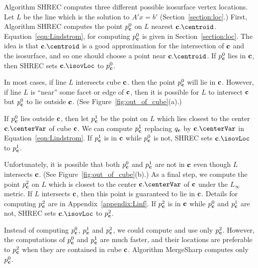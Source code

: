 Algorithm SHREC computes three different possible isosurface vertex locations.
Let $L$ be the line which is the solution to $A' x = b'$
(Section~\ref{section:loc}.)
First, Algorithm SHREC computes the point $p^0_{\mathbf{c}}$ 
on $L$ nearest $\cb.\centroid$.
Equation~\ref{eqn:Lindstrom}, for computing $p^0_{\mathbf{c}}$ is given
in Section~\ref{section:loc}.
The idea is that $\cb.\centroid$ is a good approximation
for the intersection of $\mathbf{c}$ and the isosurface,
and so one should choose a point near $\cb.\centroid$.
If $p^0_{\mathbf{c}}$ lies in $\mathbf{c}$, then SHREC sets $\cb.\isovLoc$ to $p^0_{\mathbf{c}}$.

In most cases, if line $L$ intersects cube $\mathbf{c}$.
then the point $p^0_{\mathbf{c}}$ will lie in $\mathbf{c}$.
However, if line $L$ is ``near'' some facet or edge of $\mathbf{c}$,
then it is possible for $L$ to intersect $\mathbf{c}$ but $p^0_{\mathbf{c}}$ to lie
outside $\mathbf{c}$.
(See Figure~\ref{fig:out_of_cube}(a).)

If $p^0_{\mathbf{c}}$ lies outside $\mathbf{c}$,
then let $p^1_{\mathbf{c}}$ be the point on $L$ which lies closest 
to the center $\cb.\centerVar$ of cube $\mathbf{c}$.
We can compute $p^1_{\mathbf{c}}$ replacing $q_{\mathbf{c}}$ by $\cb.\centerVar$
in Equation~\ref{eqn:Lindstrom}.
If $p^1_{\mathbf{c}}$ is in $\mathbf{c}$ while $p^0_{\mathbf{c}}$ is not,
SHREC sets $\cb.\isovLoc$ to $p^1_{\mathbf{c}}$.

Unfortunately, it is possible that both $p^0_{\mathbf{c}}$ and $p^1_{\mathbf{c}}$ 
are not in $\mathbf{c}$ even though $L$ intersects $\mathbf{c}$.
(See Figure~\ref{fig:out_of_cube}(b).)
As a final step, we compute the point $p^2_{\mathbf{c}}$ on $L$ which is closest 
to the center $\cb.\centerVar$ of $\mathbf{c}$ under the $L_\infty$ metric.
If $L$ intersects $\mathbf{c}$, then this point is guaranteed to lie in $\mathbf{c}$.
Details for computing $p^2_{\mathbf{c}}$ are in Appendix~\ref{appendix:Linf}.
If $p^2_{\mathbf{c}}$ is in $\mathbf{c}$ while $p^0_{\mathbf{c}}$ and $p^1_{\mathbf{c}}$ are not,
SHREC sets $\cb.\isovLoc$ to $p^2_{\mathbf{c}}$.

Instead of computing $p^0_{\mathbf{c}}$, $p^1_{\mathbf{c}}$ and $p^2_{\mathbf{c}}$, 
we could compute and use only $p^2_{\mathbf{c}}$.
However, the computations of $p^0_{\mathbf{c}}$ and $p^1_{\mathbf{c}}$ are much faster,
and their locations are preferable to $p^2_{\mathbf{c}}$ when they are
contained in cube $\mathbf{c}$.
Algorithm MergeSharp computes only $p^0_{\mathbf{c}}$.

